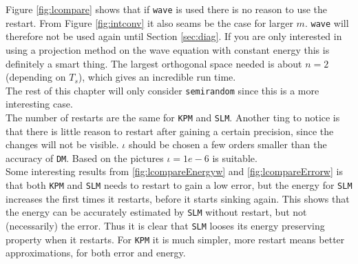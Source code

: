 Figure \ref{fig:lcompare} shows that if \texttt{wave} is used there is no reason to use the restart. From Figure \ref{fig:intconv} it also seams be the case for larger $m$. \texttt{wave} will therefore not be used again until Section \ref{sec:diag}. If you are only interested in using a projection method on the wave equation with constant energy this is definitely a smart thing. The largest orthogonal space needed is about $n=2$ (depending on $T_s$), which gives an incredible run time.\\
The rest of this chapter will only consider \texttt{semirandom} since this is a more interesting case. \\

\noindent The number of restarts are the same for \texttt{KPM} and \texttt{SLM}. Another ting to notice is that there is little reason to restart after gaining a certain precision, since the changes will not be visible. $\iota$ should be chosen a few orders smaller than the accuracy of \texttt{DM}. Based on the pictures $\iota = 1e-6$ is suitable. \\

\noindent Some interesting results from \ref{fig:lcompareEnergyw} and \ref{fig:lcompareErrorw} is that both \texttt{KPM} and \texttt{SLM} needs to restart to gain a low error, but the energy for \texttt{SLM} increases the first times it restarts, before it starts sinking again. This shows that the energy can be accurately estimated by \texttt{SLM} without restart, but not (necessarily) the error.  Thus it is clear that \texttt{SLM} looses its energy preserving property when it restarts. For \texttt{KPM} it is much simpler, more restart means better approximations, for both error and energy.\\

